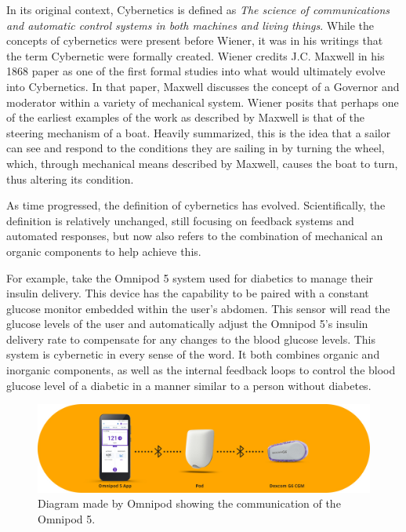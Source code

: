In its original context, Cybernetics is defined as \textit{The science of communications and automatic control systems in both machines and living things}. While the concepts of cybernetics were present before Wiener, it was in his writings that the term Cybernetic were formally created. Wiener credits J.C. Maxwell in his 1868 paper as one of the first formal studies into what would ultimately evolve into Cybernetics. In that paper, Maxwell discusses the concept of a Governor and moderator within a variety of mechanical system\cite{maxwellOnGoverners}. Wiener posits that perhaps one of the earliest examples of the work as described by Maxwell is that of the steering mechanism of a boat\cite{WeinerCybernetics2019}. Heavily summarized, this is the idea that a sailor can see and respond to the conditions they are sailing in by turning the wheel, which, through mechanical means described by Maxwell, causes the boat to turn, thus altering its condition.


As time progressed, the definition of cybernetics has evolved. Scientifically, the definition is relatively unchanged, still focusing on feedback systems and automated responses, but now also refers to the combination of mechanical an organic components to help achieve this. %

For example, take the Omnipod 5 system used for diabetics to manage their insulin delivery. This device has the capability to be paired with a constant glucose monitor embedded within the user's abdomen. This sensor will read the glucose levels of the user and automatically adjust the Omnipod 5's insulin delivery rate to compensate for any changes to the blood glucose levels. This system is cybernetic in every sense of the word. It both combines organic and inorganic components, as well as the internal feedback loops to control the blood glucose level of a diabetic in a manner similar to a person without diabetes.

\begin{figure}
    \centering
    \includegraphics[scale=0.4]{diagrams/Omnipod-5_CGM_Pod_BT_1040x277.jpg}
    \caption{Diagram made by Omnipod showing the communication of the Omnipod 5.}
    \label{fig:my_label}
\end{figure}

